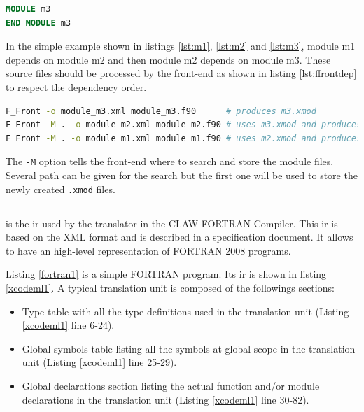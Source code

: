 \begin{lstlisting}[label=lst:m3, language=Fortran, caption=module\_m3.f90]
MODULE m3
END MODULE m3
\end{lstlisting}

In the simple example shown in listings \ref{lst:m1}, \ref{lst:m2} and
\ref{lst:m3}, module m1 depends on module m2 and then module m2
depends on module m3. These source files should be processed by the front-end
as shown in listing \ref{lst:ffrontdep} to respect the dependency order.

\begin{lstlisting}[label=lst:ffrontdep, language=Bash, caption=Parse module with dependencies]
F_Front -o module_m3.xml module_m3.f90      # produces m3.xmod
F_Front -M . -o module_m2.xml module_m2.f90 # uses m3.xmod and produces m2.xmod
F_Front -M . -o module_m1.xml module_m1.f90 # uses m2.xmod and produces m1.xmod
\end{lstlisting}

The \lstinline|-M| option tells the front-end where to search and store the 
module files. Several path can be given for the search but the first one will
be used to store the newly created \lstinline|.xmod| files.


\subsection{\xcodeml}
\xcodeml is the \gls{ir} used by the
translator in the CLAW FORTRAN Compiler. This \gls{ir} is based on the XML
format and is described in a specification 
document\cite{omni:xcodemlf95,omni:xcodemlf2008}. It allows to have an
high-level representation of FORTRAN 2008 programs.

Listing \ref{fortran1} is a simple FORTRAN program. Its \xcodeml \gls{ir} is
shown in listing \ref{xcodeml1}. A typical \xcodeml translation unit is
composed of the followings sections:
\begin{itemize}
\item Type table with all the type definitions used in the translation unit
(Listing \ref{xcodeml1} line 6-24).
\item Global symbols table listing all the symbols at global scope in the
translation unit (Listing
\ref{xcodeml1} line 25-29).
\item Global declarations section listing the actual function and/or module
declarations in the translation unit (Listing \ref{xcodeml1} line 30-82).
\end{itemize}


